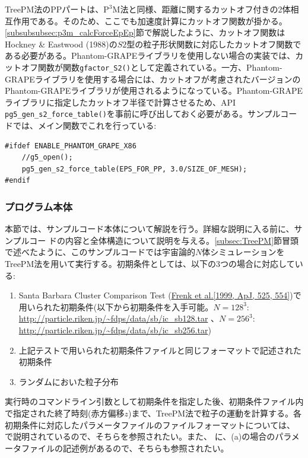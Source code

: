 

TreePM法のPPパートは、$\mathrm{P^{3}M}$法と同様、距離に関するカットオフ付きの2体相互作用である。そのため、ここでも加速度計算にカットオフ関数が掛かる。\ref{subsubsubsec:p3m_calcForceEpEp}節で解説したように、カットオフ関数はHockney \& Eastwood (1988)の$S2$型の粒子形状関数に対応したカットオフ関数である必要がある。Phantom-GRAPEライブラリを使用しない場合の実装では、カットオフ関数が関数\texttt{gfactor\_S2()}として定義されている。一方、Phantom-GRAPEライブラリを使用する場合には、カットオフが考慮されたバージョンのPhantom-GRAPEライブラリが使用されるようになっている。Phantom-GRAPEライブラリに指定したカットオフ半径で計算させるため、API \texttt{pg5\_gen\_s2\_force\_table()}を事前に呼び出しておく必要がある。サンプルコードでは、メイン関数でこれを行っている:
\begin{lstlisting}
#ifdef ENABLE_PHANTOM_GRAPE_X86 
    //g5_open();
    pg5_gen_s2_force_table(EPS_FOR_PP, 3.0/SIZE_OF_MESH);
#endif
\end{lstlisting}

\subsubsection{プログラム本体}
本節では、サンプルコード本体について解説を行う。詳細な説明に入る前に、サンプルコー ドの内容と全体構造について説明を与える。\ref{subsec:TreePM}節冒頭で述べたように、このサンプルコードでは宇宙論的$N$体シミュレーションをTreePM法を用いて実行する。初期条件としては、以下の3つの場合に対応している:
\begin{enumerate}[leftmargin=*,itemsep=-1ex,label=(\alph*)]
\item Santa Barbara Cluster Comparison Test
  (\href{http://iopscience.iop.org/article/10.1086/307908/meta}{Frenk
  et al.[1999, ApJ, 525, 554]})で用いられた初期条件(以下から初期条件を入手可能。$N=128^3$:
  \href{http://particle.riken.jp/~fdps/data/sb/ic_sb128.tar}{http://particle.riken.jp{\slash}\~{}fdps{\slash}data{\slash}sb{\slash}ic\_sb128.tar}
  、$N=256^3$:
  \href{http://particle.riken.jp/~fdps/data/sb/ic_sb256.tar}{http://particle.riken.jp{\slash}\~{}fdps{\slash}data{\slash}sb{\slash}ic\_sb256.tar})
\item 上記テストで用いられた初期条件ファイルと同じフォーマットで記述された初期条件
\item ランダムにおいた粒子分布
\end{enumerate}
実行時のコマンドライン引数として初期条件を指定した後、初期条件ファイル内で指定された終了時刻(赤方偏移$z$)まで、TreePM法で粒子の運動を計算する。各初期条件に対応したパラメータファイルのファイルフォーマットについては、 で説明されているので、そちらを参照されたい。また、 に、(a)の場合のパラメータファイルの記述例があるので、そちらも参照されたい。


